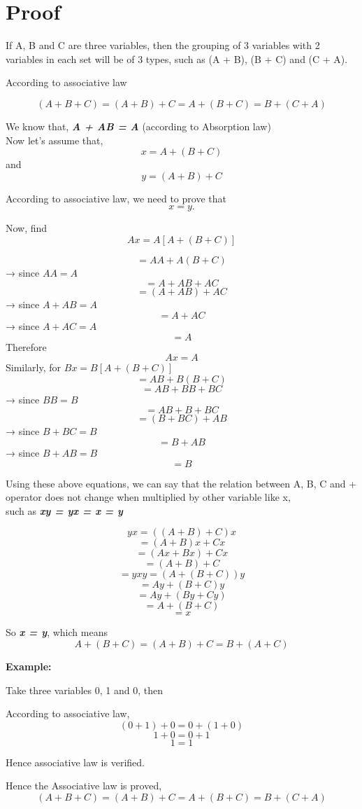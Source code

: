 \documentclass[letterpaper, 10 pt, conference]{ieeeconf}
\begin{document}
\section{Proof}

If A, B and C are three	 variables, then the grouping of 3 variables with 2 variables in each set will be of 3 types, such as (A + B), (B + C) and (C + A).

According to associative law

\[(A + B + C) = (A + B) +C = A + (B + C) = B + (C + A)\]

We know that, \textbf{\textit{A + AB = A}} (according to Absorption law)\\

Now let’s assume that, \[x = A + (B + C)\] and \[y = (A + B) + C\]

According to associative law, we need to prove that \[x = y.\]

Now, find \[Ax = A [ A + (B + C) ]\]

\[ = AA +A (B + C)\]
→ since \(AA = A\)
\[ = A + AB + AC\] 
\[ = (A+ AB) + AC\]
→ since \(A + AB = A\)
\[= A + AC\]
→ since \(A + AC = A\)
\[ = A\]
Therefore \[Ax = A\]
Similarly, for \( Bx = B [ A + (B + C) ]\)
\[ = AB +B (B + C)\]
\[ = AB + BB + BC\]
→ since \(BB = B\)
\[ = AB + B + BC\]
\[ =(B+ BC) + AB\]
→ since \(B + BC = B\)
\[= B + AB\] 
→ since \(B + AB = B\)
\[= B\] 

Using these above equations, we can say that the relation between A, B, C and + operator does not change when multiplied by other variable like x,\\such as \textbf{\textit{xy = yx = x = y}}

\[ yx = ((A + B) + C) x\]
\[ = (A + B) x + Cx\]
\[ = (Ax + Bx) + Cx\]
\[ = (A + B) + C\]
\[ = y xy = (A + (B + C)) y\]
\[ = Ay + (B + C) y\]
\[ = Ay + (By + Cy)\]
\[ = A + (B + C)\]
\[ = x\]

So \textbf{\textit{x = y}}, which means
\[A + (B + C) = (A + B) + C = B + (A + C)\]

\textbf{Example:}

Take three variables 0, 1 and 0, then

According to associative law,
\[(0 + 1) + 0 = 0 + (1 + 0)\]
\[1 + 0 = 0 + 1\]
\[1 = 1\]

Hence associative law is verified.

Hence the Associative law is proved, 
\[(A + B + C) = (A + B) +C = A + (B + C) = B + (C + A)\]
\end{document}
